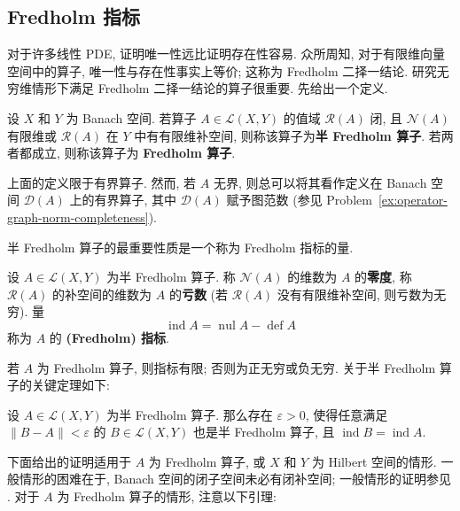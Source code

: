 \subsection{Fredholm 指标}\label{sec:fredholm-index}

对于许多线性 PDE, 证明唯一性远比证明存在性容易. 众所周知, 对于有限维向量空间中的算子, 唯一性与存在性事实上等价; 这称为 Fredholm 二择一结论. 研究无穷维情形下满足 Fredholm 二择一结论的算子很重要. 先给出一个定义.

\begin{Definition}
\label{def:semi-fredholm-and-fredholm-operators}
设 $X$ 和 $Y$ 为 Banach 空间. 若算子 $A\in\mathcal{L}(X,Y)$ 的值域 $\mathcal{R}(A)$ 闭, 且 $\mathcal{N}(A)$ 有限维或 $\mathcal{R}(A)$ 在 $Y$ 中有有限维补空间, 则称该算子为\textbf{半 Fredholm 算子}. 若两者都成立, 则称该算子为 \textbf{Fredholm 算子}.
\end{Definition}

上面的定义限于有界算子. 然而, 若 $A$ 无界, 则总可以将其看作定义在 Banach 空间 $\mathcal{D}(A)$ 上的有界算子, 其中 $\mathcal{D}(A)$ 赋予图范数 (参见 Problem~\ref{ex:operator-graph-norm-completeness}).

半 Fredholm 算子的最重要性质是一个称为 Fredholm 指标的量.

\begin{Definition}
\label{def:fredholm-nullity-deficiency-index}
设 $A\in\mathcal{L}(X,Y)$ 为半 Fredholm 算子. 称 $\mathcal{N}(A)$ 的维数为 $A$ 的\textbf{零度}, 称 $\mathcal{R}(A)$ 的补空间的维数为 $A$ 的\textbf{亏数} (若 $\mathcal{R}(A)$ 没有有限维补空间, 则亏数为无穷). 量
\begin{equation}\label{eq:fredholm-index-nullity-minus-deficiency}
\operatorname{ind}A=\operatorname{nul}A-\operatorname{def}A
\end{equation}
称为 $A$ 的 \textbf{(Fredholm) 指标}.
\end{Definition}

若 $A$ 为 Fredholm 算子, 则指标有限; 否则为正无穷或负无穷. 关于半 Fredholm 算子的关键定理如下:

\begin{Theorem}
\label{thm:semi-fredholm-index-local-stability}
设 $A\in\mathcal{L}(X,Y)$ 为半 Fredholm 算子. 那么存在 $\varepsilon>0$, 使得任意满足 $\|B-A\|<\varepsilon$ 的 $B\in\mathcal{L}(X,Y)$ 也是半 Fredholm 算子, 且 $\operatorname{ind}B=\operatorname{ind}A$.
\end{Theorem}

下面给出的证明适用于 $A$ 为 Fredholm 算子, 或 $X$ 和 $Y$ 为 Hilbert 空间的情形. 一般情形的困难在于, Banach 空间的闭子空间未必有闭补空间; 一般情形的证明参见 \cite{Ka}. 对于 $A$ 为 Fredholm 算子的情形, 注意以下引理:

